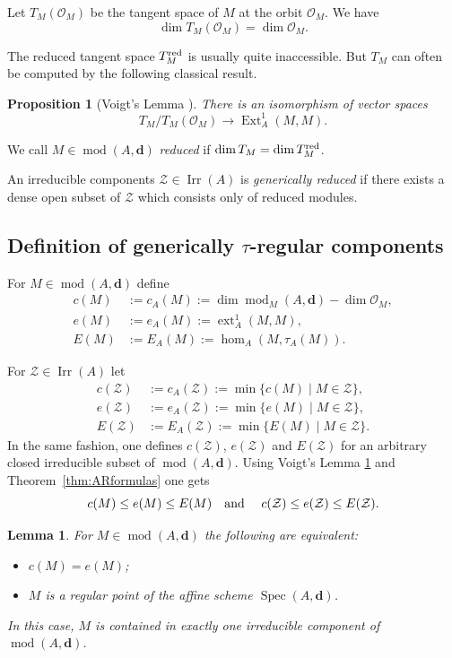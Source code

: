 \documentclass[12pt,reqno]{amsart}
\newtheorem{Lem}[Thm]{Lemma}
\newtheorem{Prop}[Thm]{Proposition}
\theoremstyle{definition}
\newcommand{\cO}{{\mathcal O}}
\newcommand{\bd}{\mathbf{d}}
\newcommand{\md}{\operatorname{mod}}
\newcommand{\Spec}{\operatorname{Spec}}
\newcommand{\dm}{{\rm dim}\,}
\newcommand{\Ext}{\operatorname{Ext}}
\newcommand{\ext}{\operatorname{ext}}
\newcommand{\irr}{\operatorname{Irr}}
\newcommand{\calZ}{\mathcal{Z}}
\begin{document}
Let $T_M(\cO_M)$ be the tangent space of $M$ at the orbit
$\cO_M$.
We have
$$
\dim T_M(\cO_M) = \dim \cO_M.
$$

The reduced tangent space $T_M^{\rm red}$ is usually quite inaccessible.
But $T_M$ can often be computed by the following classical result.

\begin{Prop}[{{Voigt's Lemma} \cite[Section~1.1]{G74}}]
\label{prop:voigt}
There is an isomorphism of vector spaces
$$
T_M/T_M(\cO_M) \to \Ext_A^1(M,M).
$$
\end{Prop}

We call $M \in \md(A,\bd)$ \emph{reduced} if $\dim T_M = \dm T_M^{\rm red}$.

An irreducible components $\calZ \in \irr(A)$ is \emph{generically
reduced} if there exists a dense open subset of $\calZ$ which
consists only of reduced modules.


\subsection{Definition of generically $\tau$-regular components}
\label{subsec:deftaureg}


For $M \in \md(A,\bd)$ define
\begin{align*}
c(M) &:=  c_A(M) := \dim \md_M(A,\bd) - \dim \cO_M,
\\
e(M) &:= e_A(M) := \ext_A^1(M,M),
\\
E(M) &:= E_A(M) := \hom_A(M,\tau_A(M)).
\end{align*}

For $\calZ \in \irr(A)$ let
\begin{align*}
c(\calZ) &:= c_A(\calZ) := \min\{ c(M) \mid M \in \calZ \},
\\
e(\calZ) &:= e_A(\calZ) := \min\{ e(M) \mid M \in \calZ \},
\\
E(\calZ) &:= E_A(\calZ) := \min\{ E(M) \mid M \in \calZ \}.
\end{align*}
In the same fashion, one defines $c(\calZ)$, $e(\calZ)$ and
$E(\calZ)$ for an arbitrary closed irreducible subset of
$\md(A,\bd)$.
Using Voigt's Lemma \ref{prop:voigt} and
Theorem~\ref{thm:ARformulas} one gets
$$
c(M) \le e(M) \le E(M)
\text{\quad and \quad}
c(\calZ) \le e(\calZ) \le E(\calZ).
$$

\begin{Lem}\label{lem:regular}
For
$M \in \md(A,\bd)$ the following are equivalent:
\begin{itemize}\itemsep2mm

\item[(i)]
$c(M) = e(M)$;

\item[(ii)]
$M$ is a regular point of the affine scheme
$\Spec(A,\bd)$.

\end{itemize}
In this case,
$M$ is contained in exactly one irreducible component
of $\md(A,\bd)$.
\end{Lem}
\end{document}
